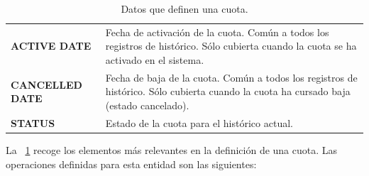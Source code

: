 \begin{table}
{\begin{tabular}{|m{4cm} m{11cm}|}
	\textbf{ACTIVE DATE} & Fecha de activación de la cuota. Común a todos los registros de histórico. Sólo cubierta cuando la cuota se ha activado en el sistema.\\
	\textbf{CANCELLED DATE} & Fecha de baja de la cuota. Común a todos los registros de histórico. Sólo cubierta cuando la cuota ha cursado baja (estado cancelado).\\
	\textbf{STATUS} & Estado de la cuota para el histórico actual.	
	\\\hline
  \end{tabular}
  } %
  \caption{Datos que definen una cuota.}
  \label{tab:cuota}
\end{table}

La \tablename~\ref{tab:cuota} recoge los elementos más relevantes en la definición de una cuota.
Las operaciones definidas para esta entidad son las siguientes:

